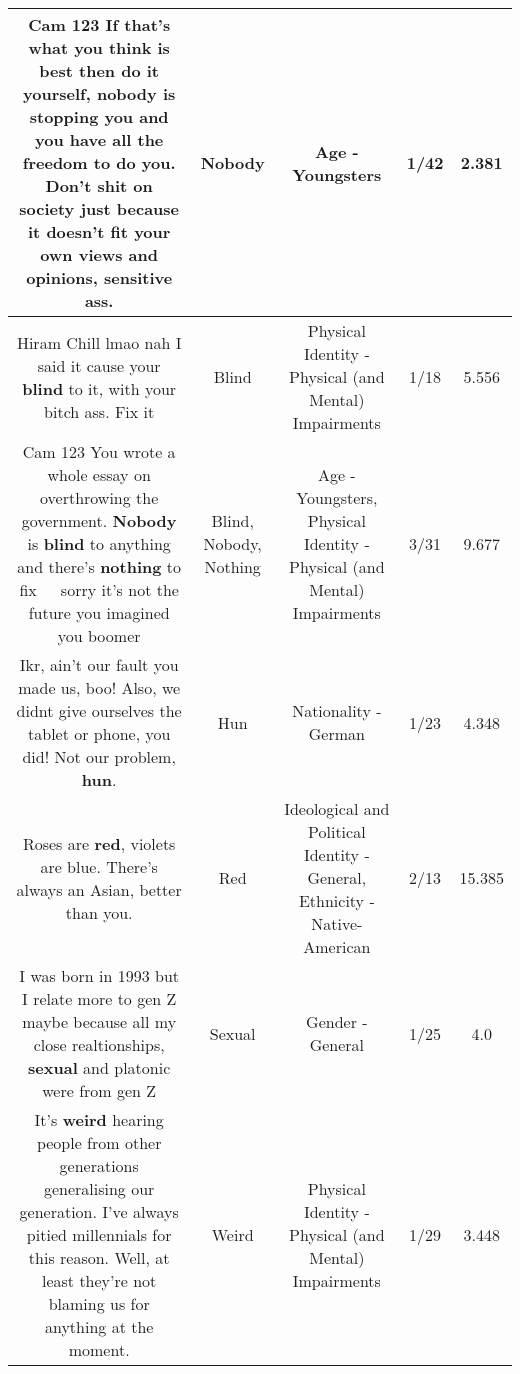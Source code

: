 \documentclass[11pt]{article}
\newlength\mylength
\begin{document}
\begin{center}
\begin{longtable}{|C{.65\mylength}|C{.30\mylength}|C{.12\mylength}|C{.12\mylength}|C{.12\mylength}|}
  \small Cam 123 If that's what you think is best then do it yourself, \textbf{nobody} is stopping you and you have all the freedom to do you. Don't shit on society just because it doesn't fit your own views and opinions, sensitive ass.\normalsize   & Nobody & Age - Youngsters & 1/42 & 2.381 \\  \hline
  \small Hiram Chill lmao nah I said it cause your \textbf{blind} to it, with your bitch ass. Fix it\normalsize   & Blind & Physical Identity - Physical (and Mental) Impairments & 1/18 & 5.556 \\  \hline
  \small Cam 123 You wrote a whole essay on overthrowing the government. \textbf{Nobody} is \textbf{blind} to anything and there's \textbf{nothing} to fix 🤷🏾‍♂️ sorry it's not the future you imagined you boomer\normalsize   & Blind, Nobody, Nothing & Age - Youngsters, Physical Identity - Physical (and Mental) Impairments & 3/31 & 9.677 \\  \hline
  \small Ikr, ain't our fault you made us, boo! Also, we didnt give ourselves the tablet or phone, you did! Not our problem, \textbf{hun}.\normalsize   & Hun & Nationality - German & 1/23 & 4.348 \\  \hline
  \small Roses are \textbf{r\textbf{ed}}, violets are blue. There's always an Asian, better than you.\normalsize   & Red &  Ideological and Political Identity - General, Ethnicity - Native-American & 2/13 & 15.385 \\  \hline
  \small I was born in 1993 but I relate more to gen Z maybe because all my close realtionships, \textbf{sexual} and platonic were from gen Z\normalsize   & Sexual & Gender - General & 1/25 & 4.0 \\  \hline
  \small It's \textbf{weird} hearing people from other generations generalising our generation. I've always pitied millennials for this reason. Well, at least they're not blaming us for anything at the moment.\normalsize   & Weird & Physical Identity - Physical (and Mental) Impairments & 1/29 & 3.448 \\  \hline

\end{longtable}
\end{center}
\end{document}
